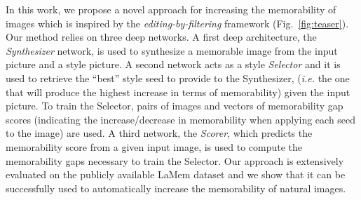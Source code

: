 \documentclass{sig-alternate-05-2015}
\begin{document}


In this work, we propose a novel approach for increasing the memorability of images which is inspired by the \textit{editing-by-filtering} framework (Fig.~\ref{fig:teaser}). Our method relies on three deep networks. A first deep architecture, the \textit{Synthesizer} network, is used to synthesize a memorable image from the input picture and a style picture. A second network acts as a style \textit{Selector} and it is used to retrieve the ``best'' style seed to provide to the Synthesizer, (\textit{i.e.} the one that will produce the highest increase in terms of memorability) given the input picture. %
To train the Selector, pairs of images and vectors of memorability gap scores (indicating the increase/decrease in memorability when applying each seed to the image) are used. A third network, the \textit{Scorer}, which predicts the memorability score from a given input image, is used to compute the memorability gaps necessary to train the Selector.
Our approach is extensively evaluated on the publicly available LaMem dataset \cite{khosla2015understanding} and we show that it can be successfully used to automatically increase the memorability of natural images.

\end{document}
